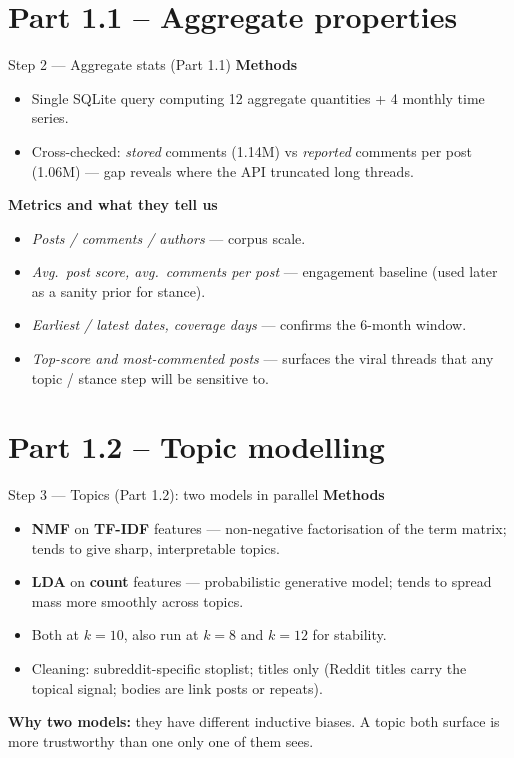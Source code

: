 \documentclass[10pt,aspectratio=169]{beamer}
\begin{document}
\section{Part 1.1 -- Aggregate properties}

\begin{frame}{Step 2 — Aggregate stats (Part 1.1)}
\textbf{Methods}
\begin{itemize}
  \item Single SQLite query computing 12 aggregate quantities + 4 monthly time series.
  \item Cross-checked: \emph{stored} comments (1.14M) vs \emph{reported} comments per post (1.06M) — gap reveals where the API truncated long threads.
\end{itemize}

\medskip
\textbf{Metrics and what they tell us}
\begin{itemize}
  \item \emph{Posts / comments / authors} — corpus scale.
  \item \emph{Avg.\ post score, avg.\ comments per post} — engagement baseline (used later as a sanity prior for stance).
  \item \emph{Earliest / latest dates, coverage days} — confirms the 6-month window.
  \item \emph{Top-score and most-commented posts} — surfaces the viral threads that any topic / stance step will be sensitive to.
\end{itemize}
\end{frame}

\section{Part 1.2 -- Topic modelling}

\begin{frame}{Step 3 — Topics (Part 1.2): two models in parallel}
\textbf{Methods}
\begin{itemize}
  \item \textbf{NMF} on \textbf{TF-IDF} features — non-negative factorisation of the term matrix; tends to give sharp, interpretable topics.
  \item \textbf{LDA} on \textbf{count} features — probabilistic generative model; tends to spread mass more smoothly across topics.
  \item Both at $k{=}10$, also run at $k{=}8$ and $k{=}12$ for stability.
  \item Cleaning: subreddit-specific stoplist; titles only (Reddit titles carry the topical signal; bodies are link posts or repeats).
\end{itemize}

\medskip
\textbf{Why two models:} they have different inductive biases. A topic both surface is more trustworthy than one only one of them sees.
\end{frame}
\end{document}
